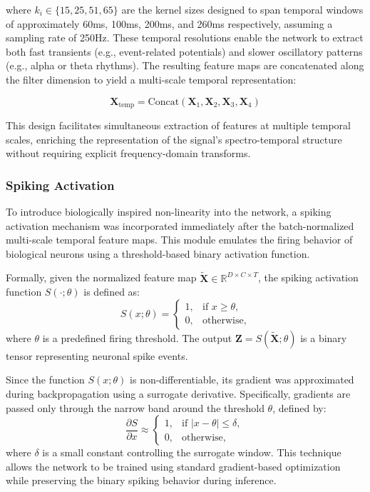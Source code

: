 \documentclass[pdflatex,sn-mathphys-num]{sn-jnl}%
\theoremstyle{thmstyleone}%
\theoremstyle{thmstyletwo}%
\theoremstyle{thmstylethree}%
\begin{document}
where $k_i \in \{15, 25, 51, 65\}$ are the kernel sizes designed to span temporal windows of approximately 60ms, 100ms, 200ms, and 260ms respectively, assuming a sampling rate of 250Hz. These temporal resolutions enable the network to extract both fast transients (e.g., event-related potentials) and slower oscillatory patterns (e.g., alpha or theta rhythms). The resulting feature maps are concatenated along the filter dimension to yield a multi-scale temporal representation:

\begin{equation}
\mathbf{X}_{\text{temp}} = \text{Concat}(\mathbf{X}_1, \mathbf{X}_2, \mathbf{X}_3, \mathbf{X}_4)
\end{equation}

This design facilitates simultaneous extraction of features at multiple temporal scales, enriching the representation of the signal's spectro-temporal structure without requiring explicit frequency-domain transforms.


\subsubsection{Spiking Activation}

To introduce biologically inspired non-linearity into the network, a spiking activation mechanism was incorporated immediately after the batch-normalized multi-scale temporal feature maps. This module emulates the firing behavior of biological neurons using a threshold-based binary activation function. \cite{Stanojevic2024-lf}

Formally, given the normalized feature map \(\tilde{\mathbf{X}} \in \mathbb{R}^{D \times C \times T}\), the spiking activation function \(S(\cdot; \theta)\) is defined as:
\[
S(x; \theta) = 
\begin{cases}
1, & \text{if } x \ge \theta, \\
0, & \text{otherwise},
\end{cases}
\]
where \(\theta\) is a predefined firing threshold. The output \(\mathbf{Z} = S(\tilde{\mathbf{X}}; \theta)\) is a binary tensor representing neuronal spike events.

Since the function \(S(x; \theta)\) is non-differentiable, its gradient was approximated during backpropagation using a surrogate derivative. Specifically, gradients are passed only through the narrow band around the threshold \(\theta\), defined by:
\[
\frac{\partial S}{\partial x} \approx 
\begin{cases}
1, & \text{if } |x - \theta| \le \delta, \\
0, & \text{otherwise},
\end{cases}
\]
where \(\delta\) is a small constant controlling the surrogate window. This technique allows the network to be trained using standard gradient-based optimization while preserving the binary spiking behavior during inference.
\end{document}
